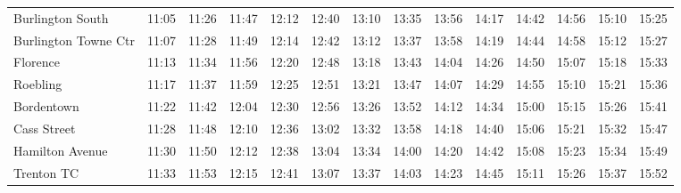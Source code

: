 \begin{center}
\begin{tabular}{@{}lrrrrrrrrrrrrr@{}}
Burlington South & 11:05 & 11:26 & 11:47 & 12:12 & 12:40 & 13:10 & 13:35 & 13:56 & 14:17 & 14:42 & 14:56 & 15:10 & 15:25 \\
Burlington Towne Ctr & 11:07 & 11:28 & 11:49 & 12:14 & 12:42 & 13:12 & 13:37 & 13:58 & 14:19 & 14:44 & 14:58 & 15:12 & 15:27 \\
Florence & 11:13 & 11:34 & 11:56 & 12:20 & 12:48 & 13:18 & 13:43 & 14:04 & 14:26 & 14:50 & 15:07 & 15:18 & 15:33 \\
Roebling & 11:17 & 11:37 & 11:59 & 12:25 & 12:51 & 13:21 & 13:47 & 14:07 & 14:29 & 14:55 & 15:10 & 15:21 & 15:36 \\
Bordentown & 11:22 & 11:42 & 12:04 & 12:30 & 12:56 & 13:26 & 13:52 & 14:12 & 14:34 & 15:00 & 15:15 & 15:26 & 15:41 \\
Cass Street & 11:28 & 11:48 & 12:10 & 12:36 & 13:02 & 13:32 & 13:58 & 14:18 & 14:40 & 15:06 & 15:21 & 15:32 & 15:47 \\
Hamilton Avenue & 11:30 & 11:50 & 12:12 & 12:38 & 13:04 & 13:34 & 14:00 & 14:20 & 14:42 & 15:08 & 15:23 & 15:34 & 15:49 \\
Trenton TC & 11:33 & 11:53 & 12:15 & 12:41 & 13:07 & 13:37 & 14:03 & 14:23 & 14:45 & 15:11 & 15:26 & 15:37 & 15:52 \\
\bottomrule\end{tabular}\end{center}
